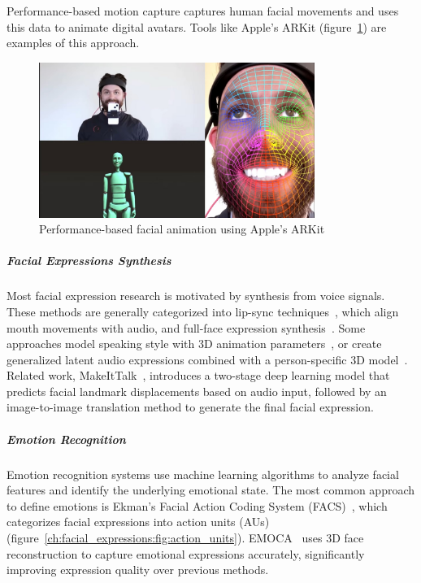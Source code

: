 \documentclass[../../main.tex]{subfiles}
\begin{document}
Performance-based motion capture captures human facial movements and uses this data to animate digital avatars. Tools like Apple's ARKit (figure~\ref{ch:facial_expressions:fig:motion_capture}) are examples of this approach.

\begin{figure}
    \centering
    \includegraphics[width=0.8\textwidth]{chapters/facial_expressions/images/motion_capture.jpg}
    \caption{Performance-based facial animation using Apple's ARKit}
    \label{ch:facial_expressions:fig:motion_capture}
\end{figure}

\subparagraph{Facial Expressions Synthesis}
\label{ch:background_work:sign_language_synthesis:3d_techniques:face_animation:facial_expressions_synthesis}

Most facial expression research is motivated by synthesis from voice signals. These methods are generally categorized into lip-sync techniques~\cite{yousaidthat, talkingface, lipmovements, lipsyncexpert}, which align mouth movements with audio, and full-face expression synthesis~\cite{eskimez, greenwood18, controllable_facial_synth}. Some approaches model speaking style with 3D animation parameters~\cite{cudeiro}, or create generalized latent audio expressions combined with a person-specific 3D model~\cite{FLAME}. Related work, MakeItTalk~\cite{Yang:2020:MakeItTalk}, introduces a two-stage deep learning model that predicts facial landmark displacements based on audio input, followed by an image-to-image translation method to generate the final facial expression. 

\subparagraph{Emotion Recognition}
\label{ch:facial_expressions:related_work:emotion_recognition}

Emotion recognition systems use machine learning algorithms to analyze facial features and identify the underlying emotional state. The most common approach to define emotions is Ekman's Facial Action Coding System (FACS)~\cite{ekman1978facial}, which categorizes facial expressions into action units (AUs) (figure~\ref{ch:facial_expressions:fig:action_units}). EMOCA~\cite{danvevcek2022emoca} uses 3D face reconstruction to capture emotional expressions accurately, significantly improving expression quality over previous methods.
\end{document}
